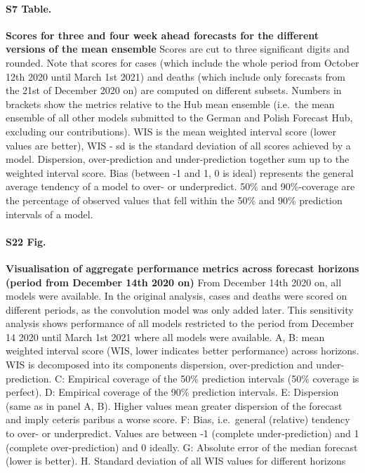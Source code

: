 \documentclass[10pt,letterpaper]{article}
\begin{document}
\paragraph{S7 Table.}
\label{tab:score-table-ensemble-mean-4}

\textbf{Scores for three and four week ahead forecasts for the different versions of the mean ensemble}
Scores are cut to three significant digits and rounded. Note that scores
for cases (which include the whole period from October 12th 2020 until
March 1st 2021) and deaths (which include only forecasts from the 21st
of December 2020 on) are computed on different subsets. Numbers in
brackets show the metrics relative to the Hub mean ensemble (i.e.~the
mean ensemble of all other models submitted to the German and Polish
Forecast Hub, excluding our contributions). WIS is the mean weighted
interval score (lower values are better), WIS - sd is the standard
deviation of all scores achieved by a model. Dispersion, over-prediction
and under-prediction together sum up to the weighted interval score.
Bias (between -1 and 1, 0 is ideal) represents the general average
tendency of a model to over- or underpredict. 50\% and 90\%-coverage are
the percentage of observed values that fell within the 50\% and 90\%
prediction intervals of a model.

\paragraph{S22 Fig.}
\label{fig:agg-performance-all-late}

\textbf{Visualisation of aggregate performance metrics across forecast horizons (period from December 14th 2020 on)}
From December 14th 2020 on, all models were available. In the original
analysis, cases and deaths were scored on different periods, as the
convolution model was only added later. This sensitivity analysis shows
performance of all models restricted to the period from December 14 2020
until March 1st 2021 where all models were available. A, B: mean
weighted interval score (WIS, lower indicates better performance) across
horizons. WIS is decomposed into its components dispersion,
over-prediction and under-prediction. C: Empirical coverage of the 50\%
prediction intervals (50\% coverage is perfect). D: Empirical coverage
of the 90\% prediction intervals. E: Dispersion (same as in panel A, B).
Higher values mean greater dispersion of the forecast and imply ceteris
paribus a worse score. F: Bias, i.e.~general (relative) tendency to
over- or underpredict. Values are between -1 (complete under-prediction)
and 1 (complete over-prediction) and 0 ideally. G: Absolute error of the
median forecast (lower is better). H. Standard deviation of all WIS
values for different horizons
\end{document}
